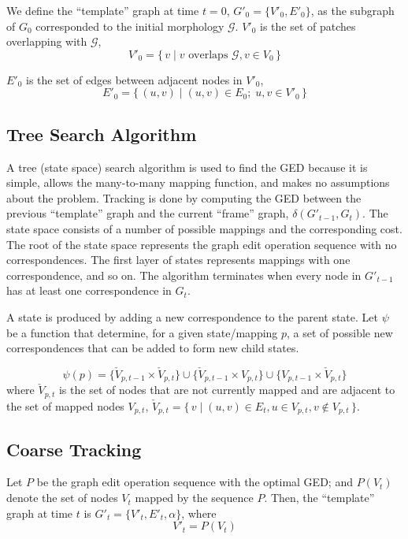 \documentclass[10pt,letterpaper]{article}
\begin{document}
We define the ``template'' graph at time $t=0$, $G'_0 =  \{V'_0, E'_0 \}$, as the subgraph of $G_0$ corresponded to the initial morphology $\mathcal{G}$. $V'_0$ is the set of patches overlapping with $\mathcal{G}$, 
\begin{equation}
V'_0 = \{\,v \mid v \text{ overlaps } \mathcal{G}, v \in V_0 \,\}
\end{equation}

$E'_0$ is the set of edges between adjacent nodes in $V'_0$, 
\begin{equation}
E'_0 = \{\, (u, v) \mid (u, v) \in E_0 ;\; u, v \in V'_0 \,\}
\end{equation}


\subsection{Tree Search Algorithm} \label{sec:treealgo}
A tree (state space) search algorithm is used to find the GED because it is simple, allows the many-to-many mapping function, and makes no assumptions about the problem. Tracking is done by computing the GED between the previous ``template'' graph and the current ``frame'' graph, $\delta (G'_{t-1}, G_t)$. The state space consists of a number of possible mappings and the corresponding cost. The root of the state space represents the graph edit operation sequence with no correspondences. The first layer of states represents mappings with one correspondence, and so on. The algorithm terminates when every node in $G'_{t-1}$ has at least one correspondence in $G_t$.



A state is produced by adding a new correspondence to the parent state. Let $\psi$ be a function that determine, for a given state/mapping $p$, a set of possible new correspondences that can be added to form new child states. 

\begin{equation}
\psi(p) = \{ \check{V}_{p,t-1} \times \check{V}_{p,t} \} \cup \{ \check{V}_{p,t-1} \times V_{p,t} \} \cup \{ V_{p,t-1} \times \check{V}_{p,t} \}
\end{equation}
where $\check{V}_{p,t}$ is the set of nodes that are not currently mapped and are adjacent to the set of mapped nodes $V_{p,t}$, $\check{V}_{p,t} = \{\, v \mid (u,v) \in E_t, u \in V_{p,t}, v \notin V_{p,t} \,\}$.



\subsection{Coarse Tracking}
Let $P$ be the graph edit operation sequence with the optimal GED; and $P(V_t)$ denote the set of nodes $V_t$ mapped by the sequence $P$. Then, the ``template'' graph at time $t$ is $G'_t =  \{V'_t, E'_t, \alpha \}$, where
\begin{equation}
V'_t = P(V_t)
\end{equation}
\end{document}
